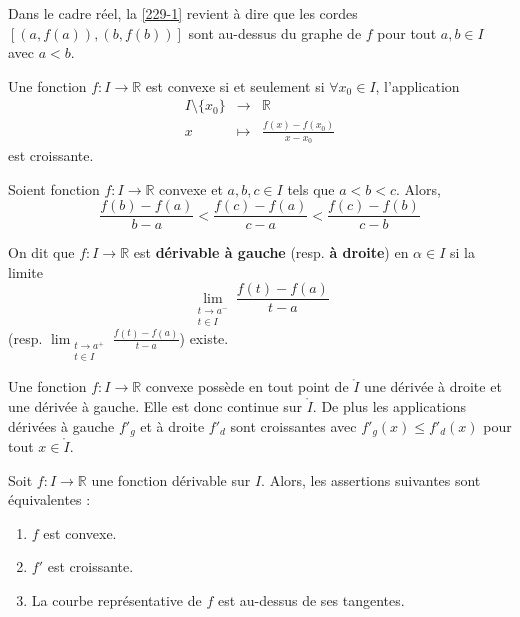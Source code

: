 
  \begin{remark}
    Dans le cadre réel, la \cref{229-1} revient à dire que les cordes $[(a, f(a)), (b, f(b))]$ sont au-dessus du graphe de $f$ pour tout $a, b \in I$ avec $a < b$.
  \end{remark}

  \begin{proposition}
    Une fonction $f : I \rightarrow \mathbb{R}$ est convexe si et seulement si $\forall x_0 \in I$, l'application
    \[
    \begin{array}{ccc}
      I \setminus \{ x_0 \} &\rightarrow& \mathbb{R} \\
      x &\mapsto& \frac{f(x) - f(x_0)}{x - x_0}
    \end{array}
    \]
    est croissante.
  \end{proposition}

  \begin{corollary}
    Soient fonction $f : I \rightarrow \mathbb{R}$ convexe et $a, b, c \in I$ tels que $a < b < c$. Alors,
    \[ \frac{f(b) - f(a)}{b-a} < \frac{f(c) - f(a)}{c-a} < \frac{f(c) - f(b)}{c-b} \]
  \end{corollary}


  \begin{definition}
    On dit que $f : I \rightarrow \mathbb{R}$ est \textbf{dérivable à gauche} (resp. \textbf{à droite}) en $\alpha \in I$ si la limite
    \[ \lim_{\substack{t \rightarrow a^{-} \\ t \in I}} \frac{f(t) - f(a)}{t-a} \]
    (resp. $\lim_{\substack{t \rightarrow a^{+} \\ t \in I}} \frac{f(t) - f(a)}{t-a}$) existe.
  \end{definition}


  \begin{proposition}
    Une fonction $f : I \rightarrow \mathbb{R}$ convexe possède en tout point de $\mathring{I}$ une dérivée à droite et une dérivée à gauche. Elle est donc continue sur $\mathring{I}$. De plus les applications dérivées à gauche $f'_g$ et à droite $f'_d$ sont croissantes avec $f'_g(x) \leq f'_d(x)$ pour tout $x \in \mathring{I}$.
  \end{proposition}

  \begin{theorem}
    Soit $f : I \rightarrow \mathbb{R}$ une fonction dérivable sur $I$. Alors, les assertions suivantes sont équivalentes :
    \begin{enumerate}[label={\bfseries(\roman*)}]
      \item $f$ est convexe.
      \item $f'$ est croissante.
      \item La courbe représentative de $f$ est au-dessus de ses tangentes.
    \end{enumerate}
  \end{theorem}

